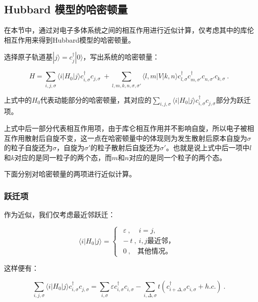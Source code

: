 

\subsection{Hubbard 模型的哈密顿量}

在本节中，通过对电子多体系统之间的相互作用进行近似计算，仅考虑其中的库伦相互作用来得到Hubbard模型的哈密顿量。

选择原子轨道基$|j\rangle =c_j^\dagger |0\rangle$，写出系统的哈密顿量：

\begin{equation}
H=\sum\limits_{i,j,\sigma}\langle i |H_0| j \rangle c_{i,\sigma}^\dagger c_{j,\sigma}~+\sum\limits_{l,m,k,n,\sigma,\sigma'}\langle l,m|V|k,n\rangle c_{l,\sigma}^\dagger  c_{m,\sigma'}^\dagger c_{n,\sigma'}^~c_{k,\sigma}^~~.
\end{equation}

上式中的$H_0$代表动能部分的哈密顿量，其对应的$\sum\limits_{i,j,\sigma}\langle i |H_0| j \rangle c_{i,\sigma}^\dagger c_{j,\sigma}^~$部分为跃迁项。

上式中后一部分代表相互作用项，由于库仑相互作用并不影响自旋，所以电子被相互作用散射后自旋不变，这一点在哈密顿量中的体现则为发生散射后原本自旋为$\sigma$的粒子自旋还为$\sigma$，自旋为$
\sigma'$的粒子散射后自旋还为$\sigma'$。也就是说上式中后一项中$l$和$k$对应的是同一粒子的两个态，而$m$和$n$对应的是同一个粒子的两个态。

下面分别对哈密顿量的两项进行近似计算。

\subsubsection{跃迁项}
作为近似，我们仅考虑最近邻跃迁：

\begin{equation}
\langle i|H_0|j \rangle=\left\{
\begin{array}{lc}
~~\varepsilon~,~~~~~ i=j, \\
~-t~,~i,j\text{最近邻，} \\
~~0~,~~~~\text{其他情况。}
\end{array}\right.~
\end{equation}

这样便有：

\begin{equation}
\sum\limits_{i,j,\sigma}\langle i|H_0|j \rangle c_{i,\sigma}^\dagger c_{j,\sigma}^~=\sum\limits_{i,\sigma}\varepsilon c_{i,\sigma}^\dagger c_{i,\sigma}^~-\sum\limits_{i,\Delta,\sigma}t\left(c_{i+\Delta,\sigma}^\dagger c_{i,\sigma}^~+h.c.\right)~.
\end{equation}

